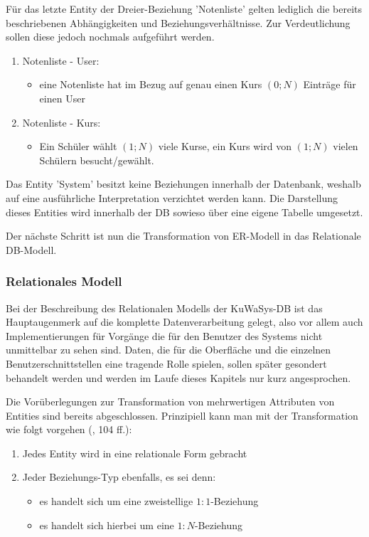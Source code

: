 Für das letzte Entity der Dreier-Beziehung 'Notenliste' gelten lediglich die bereits beschriebenen Abhängigkeiten und Beziehungsverhältnisse. 
Zur Verdeutlichung sollen diese jedoch nochmals aufgeführt werden.

\begin{enumerate}
  \item Notenliste - User:
  \begin{itemize}
    \item eine Notenliste hat im Bezug auf genau einen Kurs $(0;N)$ Einträge für einen User
  \end{itemize}
  
  \item Notenliste - Kurs:
  \begin{itemize}
    \item Ein Schüler wählt $(1;N)$ viele Kurse, ein Kurs wird von $(1;N)$ vielen Schülern besucht/gewählt.
  \end{itemize}
  
\end{enumerate}

Das Entity 'System' besitzt keine Beziehungen innerhalb der Datenbank, weshalb auf eine ausführliche Interpretation verzichtet werden kann.
Die Darstellung dieses Entities wird innerhalb der \ac{DB} sowieso über eine eigene Tabelle umgesetzt.

Der nächste Schritt ist nun die Transformation von \ac{ER-Modell} in das Relationale \ac{DB}-Modell.

\subsubsection{Relationales Modell}\label{subsec:RelModell}

Bei der Beschreibung des Relationalen Modells der KuWaSys-\ac{DB} ist das Hauptaugenmerk auf die komplette Datenverarbeitung gelegt, also vor allem auch Implementierungen für Vorgänge die für den Benutzer des Systems nicht unmittelbar zu sehen sind.
Daten, die für die Oberfläche und die einzelnen Benutzerschnittstellen eine tragende Rolle spielen, sollen später gesondert behandelt werden und werden im Laufe dieses Kapitels nur kurz angesprochen.

Die Vorüberlegungen zur Transformation von mehrwertigen Attributen von Entities sind bereits abgeschlossen.
Prinzipiell kann man mit der Transformation wie folgt vorgehen (\cite{VossenG-DDD}, 104 ff.):

\begin{enumerate}
 \item Jedes Entity wird in eine relationale Form gebracht
 \item Jeder Beziehungs-Typ ebenfalls, es sei denn:
 \begin{itemize}
  \item es handelt sich um eine zweistellige $1:1$-Beziehung
  \item es handelt sich hierbei um eine $1:N$-Beziehung
 \end{itemize}
\end{enumerate}

